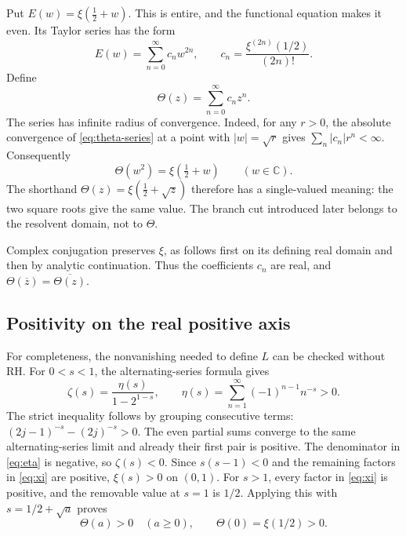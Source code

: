 \documentclass[11pt,a4paper]{article}
\numberwithin{equation}{section}
\theoremstyle{definition}
\theoremstyle{remark}
\newcommand{\C}{\mathbb C}
\begin{document}
Put $E(w)=\xi(\tfrac12+w)$. This is entire, and the functional equation
makes it even. Its Taylor series has the form
\begin{equation}\label{eq:theta-series}
E(w)=\sum_{n=0}^{\infty}c_nw^{2n},\qquad
c_n=\frac{\xi^{(2n)}(1/2)}{(2n)!}.
\end{equation}
Define
\begin{equation}\label{eq:theta-definition}
\Theta(z)=\sum_{n=0}^{\infty}c_nz^n.
\end{equation}
The series has infinite radius of convergence. Indeed, for any $r>0$,
the absolute convergence of \eqref{eq:theta-series} at a point with
$|w|=\sqrt r$ gives $\sum_n|c_n|r^n<\infty$.
Consequently
\begin{equation}\label{eq:square-descent}
\Theta(w^2)=\xi(\tfrac12+w)\qquad(w\in\C).
\end{equation}
The shorthand $\Theta(z)=\xi(\tfrac12+\sqrt z)$ therefore has a
single-valued meaning: the two square roots give the same value. The branch
cut introduced later belongs to the resolvent domain, not to $\Theta$.

Complex conjugation preserves $\xi$, as follows first on its defining
real domain and then by analytic continuation. Thus the coefficients
$c_n$ are real, and
$\Theta(\overline z)=\overline{\Theta(z)}$.

\subsection{Positivity on the real positive axis}

For completeness, the nonvanishing needed to define $L$ can be checked
without RH. For $0<s<1$, the alternating-series formula
\cite[Eq.~25.2.3]{dlmf-series} gives
\begin{equation}\label{eq:eta}
\zeta(s)=\frac{\eta(s)}{1-2^{1-s}},\qquad
\eta(s)=\sum_{n=1}^{\infty}(-1)^{n-1}n^{-s}>0.
\end{equation}
The strict inequality follows by grouping consecutive terms:
$(2j-1)^{-s}-(2j)^{-s}>0$. The even partial sums converge to the same
alternating-series limit and already their first pair is positive.
The denominator in \eqref{eq:eta} is negative, so $\zeta(s)<0$.
Since $s(s-1)<0$ and the remaining factors in \eqref{eq:xi} are positive,
$\xi(s)>0$ on $(0,1)$. For $s>1$, every factor in \eqref{eq:xi}
is positive, and the removable value at $s=1$ is $1/2$.
Applying this with $s=1/2+\sqrt a$ proves
\begin{equation}\label{eq:theta-positive}
\Theta(a)>0\quad(a\geq0),\qquad\Theta(0)=\xi(1/2)>0.
\end{equation}
\end{document}
